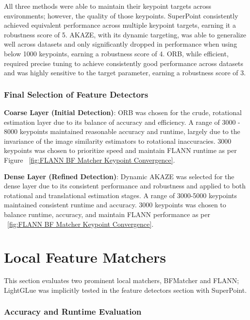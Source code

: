 All three methods were able to maintain their keypoint targets across environments; however, the quality of those keypoints. SuperPoint consistently achieved equivalent performance across multiple keypoint targets, earning it a robustness score of 5. AKAZE, with its dynamic targeting, was able to generalize well across datasets and only significantly dropped in performance when using below 1000 keypoints, earning a robustness score of 4. ORB, while efficient, required precise tuning to achieve consistently good performance across datasets and was highly sensitive to the target parameter, earning a robustness score of 3.

\subsubsection*{Final Selection of Feature Detectors}

\textbf{Coarse Layer (Initial Detection)}: ORB was chosen for the crude, rotational estimation layer due to its balance of accuracy and efficiency. A range of 3000 - 8000 keypoints maintained reasonable accuracy and runtime, largely due to the invariance of the image similarity estimators to rotational inaccuracies. 3000 keypoints was chosen to prioritize speed and maintain FLANN runtime as per Figure ~\ref{fig:FLANN BF Matcher Keypoint Convergence}.

\textbf{Dense Layer (Refined Detection)}: Dynamic AKAZE was selected for the dense layer due to its consistent performance and robustness and applied to both rotational and translational estimation stages. A range of 3000-5000 keypoints maintained consistent runtime and accuracy. 3000 keypoints was chosen to balance runtime, accuracy, and maintain FLANN performance as per ~\ref{fig:FLANN BF Matcher Keypoint Convergence}.


\vspace{-0.5cm}
\section{Local Feature Matchers}
\vspace{-0.25cm}
This section evaluates two prominent local matchers, BFMatcher and FLANN; LightGLue was implicitly tested in the feature detectors section with SuperPoint. 

\subsubsection*{Accuracy and Runtime Evaluation}

